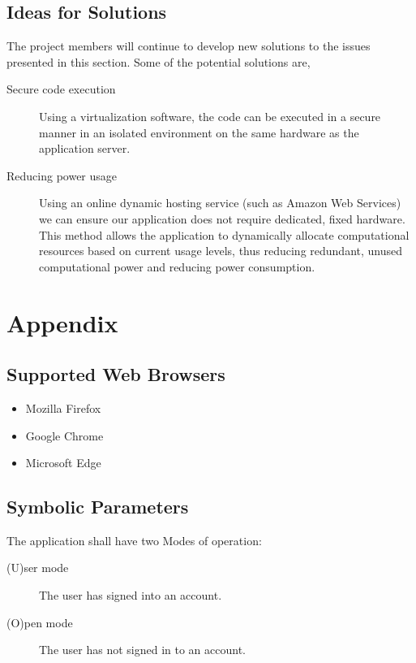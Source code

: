 \documentclass[12pt, titlepage]{article}
\begin{document}
  \subsection{Ideas for Solutions}
	The project members will continue to develop new solutions to the issues
	presented in this section. Some of the potential solutions are,
	\begin{description}
		\item [Secure code execution] Using a virtualization software, the code can
			be executed in a secure manner in an isolated environment on the same
			hardware as the application server.
		\item [Reducing power usage] Using an online dynamic hosting service (such
			as Amazon Web Services) we can ensure our application does not require
			dedicated, fixed hardware. This method allows the application to
			dynamically allocate computational resources based on current usage
			levels, thus reducing redundant, unused computational power and reducing
			power consumption.
	\end{description}





\newpage

\section{Appendix}

\subsection{Supported Web Browsers}
\begin{itemize}
	\item Mozilla Firefox
	\item Google Chrome
	\item Microsoft Edge
\end{itemize}

\subsection{Symbolic Parameters}
The application shall have two Modes of operation:
\begin{description}
	\item [(U)ser mode] The user has signed into an account.
	\item [(O)pen mode] The user has not signed in to an account.
\end{description}
\end{document}
